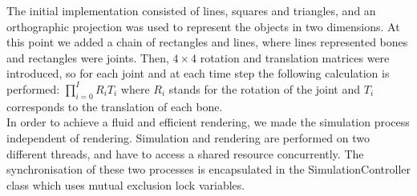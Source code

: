 \documentclass[paper=a4, fontsize=11pt]{scrartcl} %
\numberwithin{equation}{section} %
\numberwithin{figure}{section} %
\numberwithin{table}{section} %
\begin{document}
The initial implementation consisted of lines, squares and triangles, and an orthographic projection was used to represent the objects in two dimensions. 
At this point we added a chain of rectangles and lines, where lines represented bones and rectangles were joints. Then, \(4 \times 4\) rotation and translation matrices were introduced, so for each joint and at each time step the following calculation is performed:  \(\prod_{i=0}^I R_i T_i\) where \(R_i\) stands for the rotation of the joint and \(T_i\) corresponds to the translation of each bone. \\

%


%
%	
%		
%	

In order to achieve a fluid and efficient rendering, we made the simulation process independent of rendering. Simulation and rendering are performed on two different threads, and have to access a shared resource concurrently. The synchronisation of these two processes is encapsulated in the SimulationController class which uses mutual exclusion lock variables. \\
\end{document}
